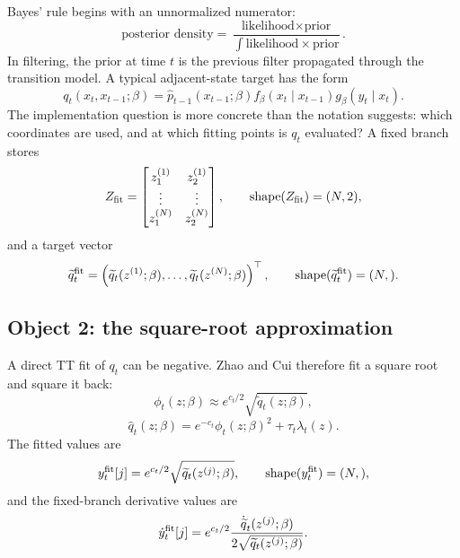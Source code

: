\documentclass[11pt]{article}
\numberwithin{equation}{section}
\newcommand{\shape}{\operatorname{shape}}
\begin{document}
Bayes' rule begins with an unnormalized numerator:
\begin{equation}
    \text{posterior density}
    =
    \frac{\text{likelihood}\times\text{prior}}
    {\int \text{likelihood}\times\text{prior}}.
    \label{eq:p24-p22-o2}
\end{equation}
In filtering, the prior at time \(t\) is the previous filter propagated through
the transition model.  A typical adjacent-state target has the form
\begin{equation}
    q_t(x_t,x_{t-1};\beta)
    =
    \widehat p_{t-1}(x_{t-1};\beta)
    f_\beta(x_t\mid x_{t-1})
    g_\beta(y_t\mid x_t).
    \label{eq:p24-p22-o3}
\end{equation}
The implementation question is more concrete than the notation suggests:
which coordinates are used, and at which fitting points is \(q_t\) evaluated?
A fixed branch stores
\begin{equation}
    Z_{\rm fit}
    =
    \begin{bmatrix}
    z_1^{(1)} & z_2^{(1)}\\
    \vdots & \vdots\\
    z_1^{(N)} & z_2^{(N)}
    \end{bmatrix},
    \qquad
    \shape(Z_{\rm fit})=(N,2),
    \label{eq:p24-p22-o4}
\end{equation}
and a target vector
\begin{equation}
    \widetilde q_t^{\rm fit}
    =
    \left(
    \widetilde q_t(z^{(1)};\beta),\ldots,
    \widetilde q_t(z^{(N)};\beta)
    \right)^\top,
    \qquad
    \shape(\widetilde q_t^{\rm fit})=(N,).
    \label{eq:p24-p22-o5}
\end{equation}

\subsection*{Object 2: the square-root approximation}

A direct TT fit of \(q_t\) can be negative.  Zhao and Cui \cite{zhao2024ttsequential} therefore fit a square
root and square it back:
\begin{equation}
    \phi_t(z;\beta)\approx e^{c_t/2}\sqrt{\widetilde q_t(z;\beta)},
    \label{eq:p24-p22-o6}
\end{equation}
\begin{equation}
    \widehat q_t(z;\beta)
    =
    e^{-c_t}\phi_t(z;\beta)^2+\tau_t\lambda_t(z).
    \label{eq:p24-p22-o7}
\end{equation}
The fitted values are
\begin{equation}
    y_t^{\rm fit}[j]
    =
    e^{c_t/2}\sqrt{\widetilde q_t(z^{(j)};\beta)},
    \qquad
    \shape(y_t^{\rm fit})=(N,),
    \label{eq:p24-p22-o8}
\end{equation}
and the fixed-branch derivative values are
\begin{equation}
    \dot y_t^{\rm fit}[j]
    =
    e^{c_t/2}
    \frac{\dot{\widetilde q}_t(z^{(j)};\beta)}
    {2\sqrt{\widetilde q_t(z^{(j)};\beta)}}.
    \label{eq:p24-p22-o9}
\end{equation}
\end{document}

